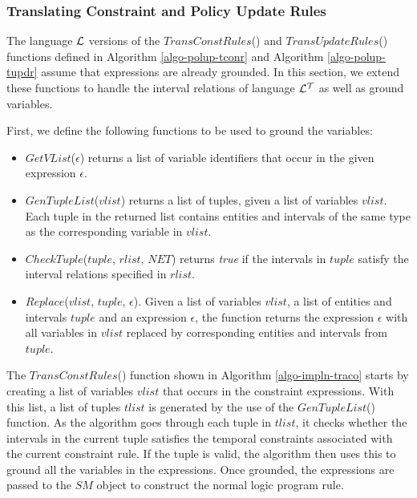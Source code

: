 \documentclass[11pt]{report}
\begin{document}
        \subsubsection{Translating Constraint and Policy Update Rules}

          The language ${\cal L}$ versions of the $TransConstRules$() and
          $TransUpdateRules$() functions defined in Algorithm
          \ref{algo-polup-tconr} and Algorithm \ref{algo-polup-tupdr} assume
          that expressions are already grounded. In this section, we extend
          these functions to handle the interval relations of language
          ${\cal L^T}$ as well as ground variables.

          First, we define the following functions to be used to ground the
          variables:

          \begin{itemize}
            \item
              $GetVList$($\epsilon$) returns a list of variable identifiers
              that occur in the given expression $\epsilon$.
         
            \item
              $GenTupleList$($vlist$) returns a list of tuples, given a list of
              variables $vlist$. Each tuple in the returned list contains
              entities and intervals of the same type as the corresponding
              variable in $vlist$.
         
            \item
              $CheckTuple$($tuple$, $rlist$, $NET$) returns {\em true} if the
              intervals in $tuple$ satisfy the interval relations specified in
              $rlist$.
         
            \item
              $Replace$($vlist$, $tuple$, $\epsilon$). Given a list of
              variables $vlist$, a list of entities and intervals $tuple$ and
              an expression $\epsilon$, the function returns the expression
              $\epsilon$ with all variables in $vlist$ replaced by
              corresponding entities and intervals from $tuple$.
          \end{itemize}

          The $TransConstRules$() function shown in Algorithm
          \ref{algo-impln-traco} starts by creating a list of variables
          $vlist$ that occurs in the constraint expressions. With this list,
          a list of tuples $tlist$ is generated by the use of the
          $GenTupleList$() function. As the algorithm goes through each tuple
          in $tlist$, it checks whether the intervals in the current tuple
          satisfies the temporal constraints associated with the current
          constraint rule. If the tuple is valid, the algorithm then uses
          this to ground all the variables in the expressions. Once grounded,
          the expressions are passed to the $SM$ object to construct the
          normal logic program rule.
\end{document}
